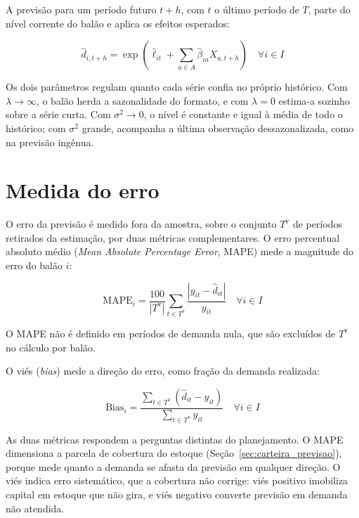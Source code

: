 \documentclass[
    12pt,
    openright,
    oneside,
    a4paper,
    fleqn,
    chapter=TITLE,
    section=TITLE,
    english,
    brazil
]{abntex2}
\begin{document}
A previsão para um período futuro $t+h$, com $t$ o último período de $T$, parte do nível corrente do balão e aplica os efeitos esperados:
\begin{ceqn}
\begin{equation}
\hat{d}_{i,t+h} = \exp \left( \hat{\ell}_{it} + \sum_{a \in A} \hat{\beta}_{ia} X_{a,t+h} \right) \quad \forall i \in I
\label{eq:forecast_final}
\end{equation}
\end{ceqn}

Os dois parâmetros regulam quanto cada série confia no próprio histórico. Com $\lambda \to \infty$, o balão herda a sazonalidade do formato, e com $\lambda = 0$ estima-a sozinho sobre a série curta. Com $\sigma^{2} \to 0$, o nível é constante e igual à média de todo o histórico; com $\sigma^{2}$ grande, acompanha a última observação dessazonalizada, como na previsão ingênua.

\section{Medida do erro}
\label{sec:avaliacao_previsao}

O erro da previsão é medido fora da amostra, sobre o conjunto $T^{\mathrm{v}}$ de períodos retirados da estimação, por duas métricas complementares. O erro percentual absoluto médio (\textit{Mean Absolute Percentage Error}, MAPE) mede a magnitude do erro do balão $i$:
\begin{ceqn}
\begin{equation}
\mathrm{MAPE}_{i} = \frac{100}{|T^{\mathrm{v}}|} \sum_{t \in T^{\mathrm{v}}} \frac{\left| y_{it} - \hat{d}_{it} \right|}{y_{it}} \quad \forall i \in I
\label{eq:mape}
\end{equation}
\end{ceqn}
O MAPE não é definido em períodos de demanda nula, que são excluídos de $T^{\mathrm{v}}$ no cálculo por balão.

O viés (\textit{bias}) mede a direção do erro, como fração da demanda realizada:
\begin{ceqn}
\begin{equation}
\mathrm{Bias}_{i} = \frac{\sum_{t \in T^{\mathrm{v}}} \left( \hat{d}_{it} - y_{it} \right)}{\sum_{t \in T^{\mathrm{v}}} y_{it}} \quad \forall i \in I
\label{eq:bias}
\end{equation}
\end{ceqn}

As duas métricas respondem a perguntas distintas do planejamento. O MAPE dimensiona a parcela de cobertura do estoque (Seção~\ref{sec:carteira_previsao}), porque mede quanto a demanda se afasta da previsão em qualquer direção. O viés indica erro sistemático, que a cobertura não corrige: viés positivo imobiliza capital em estoque que não gira, e viés negativo converte previsão em demanda não atendida.
\end{document}
